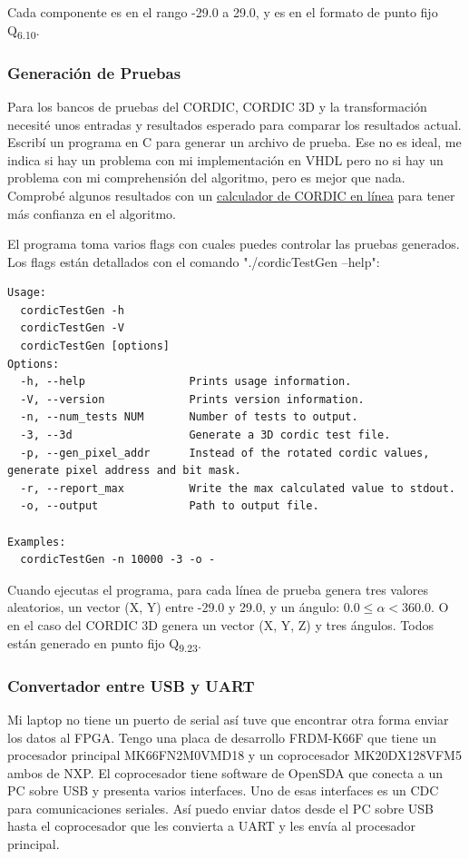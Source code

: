 \documentclass[a4paper]{article}
\begin{document}
Cada componente es en el rango -29.0 a 29.0, y es en el formato de punto fijo Q\textsubscript{6.10}.

\subsubsection{Generación de Pruebas}

Para los bancos de pruebas del CORDIC, CORDIC 3D y la transformación necesité unos entradas y resultados esperado para comparar los resultados actual. Escribí un programa en C para generar un archivo de prueba. Ese no es ideal, me indica si hay un problema con mi implementación en VHDL pero no si hay un problema con mi comprehensión del algoritmo, pero es mejor que nada. Comprobé algunos resultados con un \href{https://g2384.github.io/work/cordic.html}{calculador de CORDIC en línea} para tener más confianza en el algoritmo.

El programa toma varios flags con cuales puedes controlar las pruebas generados. Los flags están detallados con el comando "./cordicTestGen --help":

\begin{verbatim}
Usage:
  cordicTestGen -h
  cordicTestGen -V
  cordicTestGen [options]
Options:
  -h, --help                Prints usage information.
  -V, --version             Prints version information.
  -n, --num_tests NUM       Number of tests to output.
  -3, --3d                  Generate a 3D cordic test file.
  -p, --gen_pixel_addr      Instead of the rotated cordic values, generate pixel address and bit mask.
  -r, --report_max          Write the max calculated value to stdout.
  -o, --output              Path to output file.

Examples:
  cordicTestGen -n 10000 -3 -o -
\end{verbatim}

Cuando ejecutas el programa, para cada línea de prueba genera tres valores aleatorios, un vector (X, Y) entre -29.0 y 29.0, y un ángulo: $ 0.0 \leq \alpha < 360.0 $. O en el caso del CORDIC 3D genera un vector (X, Y, Z) y tres ángulos. Todos están generado en punto fijo Q\textsubscript{9.23}.

\subsubsection{Convertador entre USB y UART}

Mi laptop no tiene un puerto de serial así tuve que encontrar otra forma enviar los datos al FPGA. Tengo una placa de desarrollo FRDM-K66F que tiene un procesador principal MK66FN2M0VMD18 y un coprocesador MK20DX128VFM5 ambos de NXP. El coprocesador tiene software de OpenSDA que conecta a un PC sobre USB y presenta varios interfaces. Uno de esas interfaces es un CDC para comunicaciones seriales. Así puedo enviar datos desde el PC sobre USB hasta el coprocesador que les convierta a UART y les envía al procesador principal.
\end{document}
